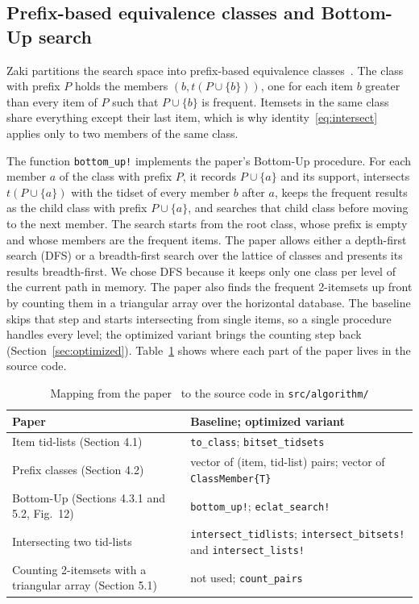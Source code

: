 \subsection{Prefix-based equivalence classes and Bottom-Up search}
Zaki partitions the search space into prefix-based equivalence
classes~\cite{zaki2000}. The class with prefix $P$ holds the members
$(b, t(P \cup \{b\}))$, one for each item $b$ greater than every item of $P$ such that
$P \cup \{b\}$ is frequent. Itemsets in the same class share everything except their
last item, which is why identity~\eqref{eq:intersect} applies only to two members of the
same class.

The function \texttt{bottom\_up!} implements the paper's Bottom-Up procedure. For each
member $a$ of the class with prefix $P$, it records $P \cup \{a\}$ and its support,
intersects $t(P \cup \{a\})$ with the tidset of every member $b$ after $a$, keeps the
frequent results as the child class with prefix $P \cup \{a\}$, and searches that child
class before moving to the next member. The search starts from the root class, whose
prefix is empty and whose members are the frequent items. The paper allows either a
depth-first search (DFS) or a breadth-first search over the lattice of classes and
presents its results breadth-first. We chose DFS because it keeps only one class per level
of the current path in memory. The paper also finds the frequent 2-itemsets up front by
counting them in a triangular array over the horizontal database. The baseline skips that
step and starts intersecting from single items, so a single procedure handles every
level; the optimized variant brings the counting step back
(Section~\ref{sec:optimized}). Table~\ref{tab:mapping} shows where each part of the paper
lives in the source code.

\begin{table}[t]
\centering
\small
\caption{Mapping from the paper~\cite{zaki2000} to the source code in \texttt{src/algorithm/}}
\label{tab:mapping}
\begin{tabular}{>{\raggedright\arraybackslash}p{}>{\raggedright\arraybackslash}p{}}
\hline
Paper & Baseline; optimized variant \\
\hline
Item tid-lists (Section 4.1) & \texttt{to\_class}; \texttt{bitset\_tidsets} \\
Prefix classes (Section 4.2) & vector of (item, tid-list) pairs; vector of
\texttt{ClassMember\{T\}} \\
Bottom-Up (Sections 4.3.1 and 5.2, Fig.~12) & \texttt{bottom\_up!}; \texttt{eclat\_search!} \\
Intersecting two tid-lists & \texttt{intersect\_tidlists}; \texttt{intersect\_bitsets!} and
\texttt{intersect\_lists!} \\
Counting 2-itemsets with a triangular array (Section 5.1) & not used; \texttt{count\_pairs} \\
\hline
\end{tabular}
\end{table}


